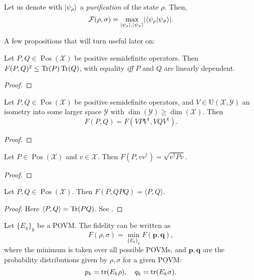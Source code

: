 \documentclass[12pt]{report}
\newcommand{\bs}[1]{\boldsymbol{#1}}
\newcommand{\calF}{{\mathcal{F}}}
\newcommand{\calY}{{\mathcal{Y}}}
\newcommand{\calX}{{\mathcal{X}}}
\newcommand{\rmU}{{\mathrm{U}}}
\DeclareMathOperator{\Pos}{Pos}
\begin{document}
\begin{thm}
	Let us denote with $\ket{\psi_\rho}$ a \emph{purification} of the state $\rho$. Then,
	\begin{equation}
		\calF(\rho,\sigma)=\max_{\ket{\psi_\rho},\ket{\psi_\sigma}}\lvert\braket{\psi_\rho}{\psi_\sigma}\rvert.
	\end{equation}
\end{thm}

A few propositions that will turn useful later on:
\begin{prop}
	Let $P,Q\in\Pos(\calX)$ be positive semidefinite operators.
	Then $F(P,Q)^2 \le \Tr(P)\Tr(Q)$, with equality \emph{iff} $P$ and $Q$ are linearly dependent.
\end{prop}
\begin{proof}
\end{proof}

\begin{prop}
	Let $P,Q\in\Pos(\calX)$ be positive semidefinite operators, and $V\in\rmU(\calX,\calY)$ an isometry into some larger space $\calY$ with $\dim(\calY)\ge\dim(\calX)$. Then
	\begin{equation}
		F(P,Q) = F(VPV^\dagger, VQV^\dagger).
	\end{equation}
\end{prop}
\begin{proof}
\end{proof}

\begin{prop}
	Let $P\in\Pos(\calX)$ and $v\in\calX$. Then
	$F(P,vv^\dagger) = \sqrt{v^\dagger  P v}$.
\end{prop}
\begin{proof}
\end{proof}

\begin{prop}
	Let $P,Q\in\Pos(\calX)$. Then
	$F(P,QPQ) = \langle P,Q\rangle$.
\end{prop}
\begin{proof}
	Here $\langle P,Q\rangle=\Tr(PQ)$. See .
\end{proof}


\begin{prop}
	Let $\{E_k\}_k$ be a POVM. The fidelity can be written as
	\begin{equation}
		F(\rho,\sigma)=\min_{\{E_k\}_k} F(\bs p,\bs q),
	\end{equation}
	where the minimum is taken over all possible POVMs, and $\bs p,\bs q$ are the probability distributions given by $\rho,\sigma$ for a given POVM:
	\begin{equation}
		p_k=\tr(E_k \rho),\quad q_k=\tr(E_k \sigma).
	\end{equation}
\end{prop}
\end{document}
